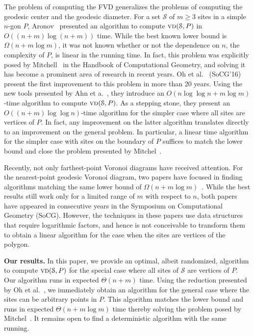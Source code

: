 \documentclass[a4paper,UKenglish]{socg-lipics-v2018}
\newcommand{\s}{\mathcal S}
\newcommand{\vd}[2][P]{\textsc{vd}(#2, #1)}
\begin{document}
The problem of computing the FVD generalizes the problems of computing the geodesic center and the geodesic diameter.  
For a set $\s$ of $m\geq 3$ sites in a simple $n$-gon $P$, Aronov~\cite{aronov1993furthest} presented an algorithm to compute $\vd{\s}$ in $O((n+m)\log (n+ m))$ time.  
While the best known lower bound is $\Omega(n + m \log m)$, it was not known whether or not the dependence on $n$, the complexity of $P$, is linear in the running time.  
In fact, this problem was explicitly posed by Mitchell~\cite[Chapter 27]{m-gspno-00} in the Handbook of Computational Geometry, and solving it has become a prominent area of research in recent years.
Oh et al.~\cite{oh2016farthest} (SoCG'16) present the first improvement to this problem in more than 20 years. 
Using the new tools presented by Ahn et a.~\cite{ahn2015linear}, they introduce an $O(n \log\log n+m\log m)$-time algorithm to compute $\vd{\s}$. 
As a stepping stone, they present an $O((n+m)\log\log n)$-time algorithm for the simpler case where all sites are vertices of $P$.
In fact, any improvement on the latter algorithm translates directly to an improvement on the general problem.
In particular, a linear time algorithm for the simpler case with sites on the boundary of $P$ suffices to match the lower bound and close the problem presented by Mitchel~\cite[Chapter 27]{m-gspno-00}.

Recently, not only farthest-point Voronoi diagrams have received attention. 
For the nearest-point geodesic Voronoi diagram, two papers have focused in finding algorithms matching the same lower bound of $\Omega(n + m\log m)$~\cite{chihungVoronoi,oh2017voronoi}.
While the best results still work only for a limited range of $m$ with respect to $n$, both papers have appeared in consecutive years in the Symposium on Computational Geometry (SoCG).
However, the techniques in these papers use data structures that require logarithmic factors, and hence is not conceivable to transform them to obtain a linear algorithm for the case when the sites are vertices of the polygon. 

\textbf{Our results.} 
In this paper, we provide an optimal, albeit randomized, algorithm to compute $\vd{\s}$ for the special case where all sites of $\s$ are vertices of $P$.
Our algorithm runs in expected $\Theta(n + m)$ time. 
Using the reduction presented by Oh et al.~\cite{oh2016farthest}, we immediately obtain an algorithm for the general case where the sites can be arbitrary points in $P$.
This algorithm matches the lower bound and runs in expected $\Theta(n + m\log m)$ time thereby solving the problem posed by Mitchel~\cite[Chapter 27]{m-gspno-00}.
It remains open to find a deterministic algorithm with the same running.
\end{document}
